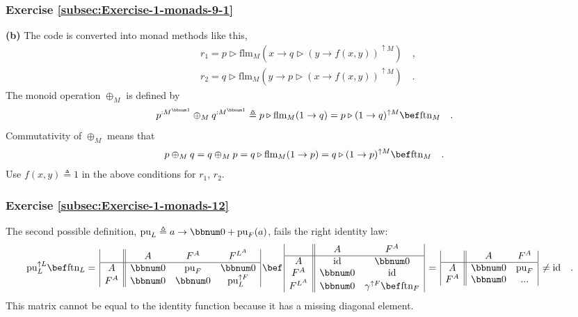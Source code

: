 \subsubsection*{Exercise \ref{subsec:Exercise-1-monads-9-1}}

\textbf{(b)} The code is converted into monad methods like this,
\begin{align*}
 & r_{1}=p\triangleright\text{flm}_{M}(x\rightarrow q\triangleright(y\rightarrow f(x,y))^{\uparrow M})\quad,\\
 & r_{2}=q\triangleright\text{flm}_{M}(y\rightarrow p\triangleright(x\rightarrow f(x,y))^{\uparrow M})\quad.
\end{align*}
The monoid operation $\oplus_{M}$ is defined by
\[
p^{:M^{\bbnum 1}}\oplus_{M}q^{:M^{\bbnum 1}}\triangleq p\triangleright\text{flm}_{M}(1\rightarrow q)=p\triangleright(1\rightarrow q)^{\uparrow M}\bef\text{ftn}_{M}\quad.
\]
Commutativity of $\oplus_{M}$ means that
\[
p\oplus_{M}q=q\oplus_{M}p=q\triangleright\text{flm}_{M}(1\rightarrow p)=q\triangleright(1\rightarrow p)^{\uparrow M}\bef\text{ftn}_{M}\quad.
\]
Use $f(x,y)\triangleq1$ in the above conditions for $r_{1}$, $r_{2}$.

\subsubsection*{Exercise \ref{subsec:Exercise-1-monads-12}}

The second possible definition, $\text{pu}_{L}\triangleq a\rightarrow\bbnum 0+\text{pu}_{F}(a)$,
fails the right identity law:
\begin{align*}
 & \text{pu}_{L}^{\uparrow L}\bef\text{ftn}_{L}=\,\begin{array}{|c||ccc|}
 & A & F^{A} & F^{L^{A}}\\
\hline A & \bbnum 0 & \text{pu}_{F} & \bbnum 0\\
F^{A} & \bbnum 0 & \bbnum 0 & \text{pu}_{L}^{\uparrow F}
\end{array}\,\bef\,\begin{array}{|c||cc|}
 & A & F^{A}\\
\hline A & \text{id} & \bbnum 0\\
F^{A} & \bbnum 0 & \text{id}\\
F^{L^{A}} & \bbnum 0 & \gamma^{\uparrow F}\bef\text{ftn}_{F}
\end{array}\,=\,\begin{array}{|c||cc|}
 & A & F^{A}\\
\hline A & \bbnum 0 & \text{pu}_{F}\\
F^{A} & \bbnum 0 & ...
\end{array}\,\neq\text{id}\quad.
\end{align*}
This matrix cannot be equal to the identity function because it has
a missing diagonal element.

